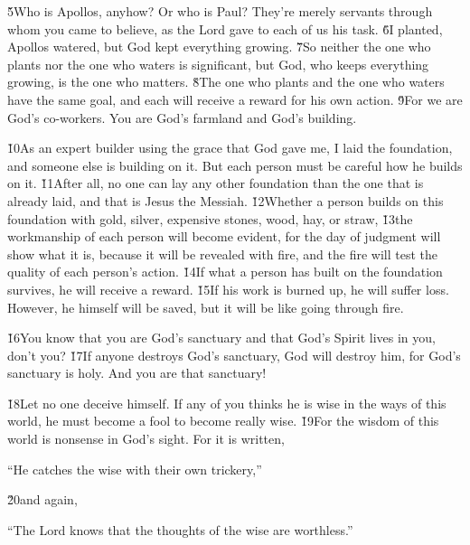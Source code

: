 \v{5}Who is Apollos, anyhow? Or who is Paul? They're merely servants through whom you came to believe, as the Lord gave to each of us his task. \v{6}I planted, Apollos watered, but God kept everything growing. \v{7}So neither the one who plants nor the one who waters is significant, but God, who keeps everything growing, is the one who matters. \v{8}The one who plants and the one who waters have the same goal, and each will receive a reward for his own action. \v{9}For we are God's co-workers. You are God's farmland and God's building.

\v{10}As an expert builder using the grace that God gave me, I laid the foundation, and someone else is building on it. But each person must be careful how he builds on it. \v{11}After all, no one can lay any other foundation than the one that is already laid, and that is Jesus the Messiah. \v{12}Whether a person builds on this foundation with gold, silver, expensive stones, wood, hay, or straw, \v{13}the workmanship of each person will become evident, for the day of judgment will show what it is, because it will be revealed with fire, and the fire will test the quality of each person's action. \v{14}If what a person has built on the foundation survives, he will receive a reward. \v{15}If his work is burned up, he will suffer loss. However, he himself will be saved, but it will be like going through fire.

\v{16}You know that you are God's sanctuary and that God's Spirit lives in you, don't you? \v{17}If anyone destroys God's sanctuary, God will destroy him, for God's sanctuary is holy. And you are that sanctuary!

\v{18}Let no one deceive himself. If any of you thinks he is wise in the ways of this world, he must become a fool to become really wise. \v{19}For the wisdom of this world is nonsense in God's sight. For it is written,

\begin{poetry}
\poeml ``He catches the wise with their own trickery,''
\end{poetry}

\v{20}and again,

\begin{poetry}
\poeml ``The Lord knows that the thoughts of the wise are worthless.''
\end{poetry}

